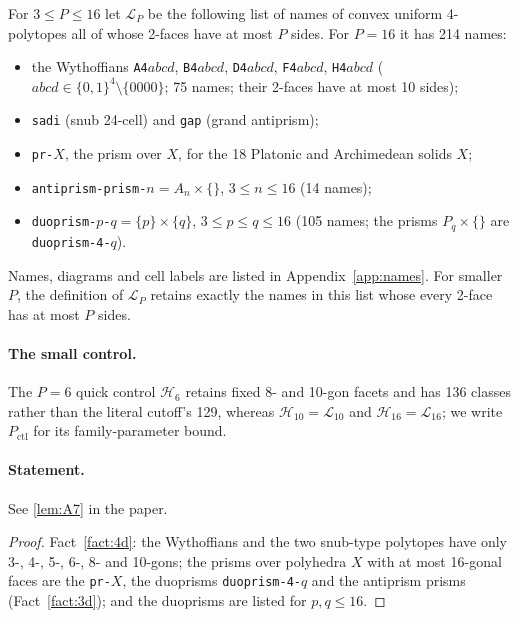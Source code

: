 \documentclass[11pt]{article}
\theoremstyle{definition}
\theoremstyle{remark}
\begin{document}
For $3\le P\le16$ let $\mathcal L_P$ be the following list of names of convex
uniform 4-polytopes all of whose 2-faces have at most $P$ sides. For
$P=16$ it has 214 names:
\begin{itemize}[leftmargin=2em]
\item the Wythoffians \texttt{A4}$abcd$, \texttt{B4}$abcd$, \texttt{D4}$abcd$,
  \texttt{F4}$abcd$, \texttt{H4}$abcd$ ($abcd\in\{0,1\}^4\setminus\{0000\}$;
  75 names; their 2-faces have at most 10 sides);
\item \texttt{sadi} (snub 24-cell) and \texttt{gap} (grand antiprism);
\item \texttt{pr-}$X$, the prism over $X$, for the 18 Platonic and
  Archimedean solids $X$;
\item \texttt{antiprism-prism-}$n=A_n\times\{\}$, $3\le n\le16$ (14 names);
\item \texttt{duoprism-}$p$\texttt{-}$q=\{p\}\times\{q\}$, $3\le p\le q\le16$
  (105 names; the prisms $P_q\times\{\}$ are \texttt{duoprism-4-}$q$).
\end{itemize}
Names, diagrams and cell labels are listed in Appendix~\ref{app:names}.
For smaller $P$, the definition of $\mathcal L_P$ retains exactly the names
in this list whose every 2-face has at most $P$ sides.

\paragraph{The small control.}\label{sec:control-library}
The $P=6$ quick control $\mathcal H_6$ retains fixed 8- and 10-gon facets
and has 136 classes rather than the literal cutoff's 129, whereas
$\mathcal H_{10}=\mathcal L_{10}$ and $\mathcal H_{16}=\mathcal L_{16}$;
we write $P_{\mathrm{ctl}}$ for its family-parameter bound.

\setcounter{theorem}{0}
\paragraph{Statement.} See \ref{lem:A7} in the paper.

\begin{proof}
Fact~\ref{fact:4d}: the Wythoffians and the two snub-type polytopes have
only 3-, 4-, 5-, 6-, 8- and 10-gons; the prisms over polyhedra $X$ with at
most 16-gonal faces are the \texttt{pr-}$X$, the duoprisms
\texttt{duoprism-4-}$q$ and the antiprism prisms (Fact~\ref{fact:3d}); and
the duoprisms are listed for $p,q\le16$.
\end{proof}
\end{document}
